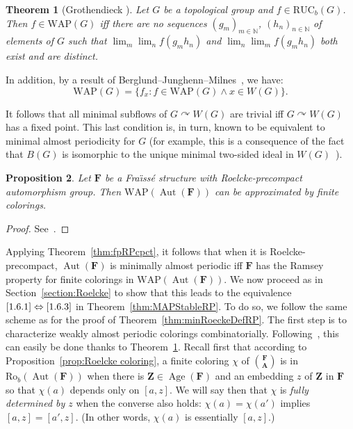 \documentclass[11pt]{article}
\newtheorem{theo}{Theorem}[section]
\newtheorem{prop}[theo]{Proposition}
\theoremstyle{definition}
\numberwithin{equation}{section}
\numberwithin{figure}{section}
\numberwithin{table}{section}
\newcommand{\N}{\mathbb{N}}
\newcommand*{\mA}{\mathbf{A}}
\newcommand*{\mF}{\mathbf{F}}
\newcommand*{\mZ}{\mathbf{Z}}
\DeclareMathOperator{\Aut}{Aut}
\DeclareMathOperator{\Age}{Age}
\newcommand{\actson}{\curvearrowright}
\newcommand{\RUCB}{\mathrm{RUC}_{b}}
\newcommand{\ROB}{\mathrm{Ro}_{b}}
\newcommand{\WAP}{\mathrm{WAP}}
\begin{document}
\begin{theo}[{Grothendieck \cite[Proposition~7]{Grothendieck}}]
\label{thm:Gro}
Let $G$ be a topological group and $f\in \RUCB(G)$. Then $f\in \WAP(G)$ iff there are no sequences $(g_{m})_{m\in \N}$, $(h_{n})_{n\in \N}$ of elements of $G$ such that $\displaystyle \lim_{m}\lim_{n}f(g_{m}h_{n})$ and $\displaystyle \lim_{n}\lim_{m}f(g_{m}h_{n})$ both exist and are distinct.
\end{theo}

In addition, by a result of Berglund--Junghenn--Milnes~\cite[Chapter~III,\linebreak Lemma~8.8]{BJM}, we have:
\[
\WAP(G)=\{ f_{x}:f\in \WAP(G) \wedge x\in W(G)\}.
\]

It follows that all minimal subflows of $G\actson W(G)$ are trivial iff $G\actson W(G)$ has a fixed point. This last condition is, in turn, known to be equivalent to minimal almost periodicity for $G$ (for example, this is a consequence of the fact that $B(G)$ is isomorphic to the unique minimal two-sided ideal in $W(G)$~\cite[Chapter~III, Section~1.9]{Ru}).

\begin{prop}\label{prop:ApproxWAP}
Let $\mF$ be a Fra\"{\i}ss\'e structure with Roelcke-precompact automorphism group. Then $\WAP(\Aut(\mF))$ can be approximated by finite colorings.
\end{prop}

\begin{proof}
See~\cite[Proposition~4.7]{BYT}.
\end{proof}

Applying Theorem~\ref{thm:fpRPcpct}, it follows that when it is Roelcke-precompact, $\Aut(\mF)$ is minimally almost periodic iff $\mF$ has the Ramsey property for finite colorings in $\WAP(\Aut(\mF))$. We now proceed as in Section~\ref{section:Roelcke} to show that this leads to the equivalence $\eqref{1.6.1}\Leftrightarrow \eqref{1.6.3}$ in Theorem~\ref{thm:MAPStableRP}. To do so, we follow the same scheme as for the proof of Theorem~\ref{thm:minRoeckeDefRP}. The first step is to characterize weakly almost periodic colorings combinatorially. Following~\cite{BYT}, this can easily be done thanks to Theorem~\ref{thm:Gro}. Recall first that according to Proposition~\ref{prop:Roelcke coloring}, a finite coloring $\chi$ of $\binom{\mF}{\mA}$ is in $\ROB(\Aut(\mF))$ when there is $\mZ \in \Age(\mF)$ and an embedding $z$ of $\mZ$ in $\mF$ so that $\chi(a)$ depends only on $[a,z]$. We will say then that $\chi$ is \emph{fully determined by $z$} when the converse also holds: $\chi(a)=\chi(a')$ implies $[a,z]=[a',z]$. (In other words, $\chi(a)$ is essentially $[a,z]$.)
\end{document}
